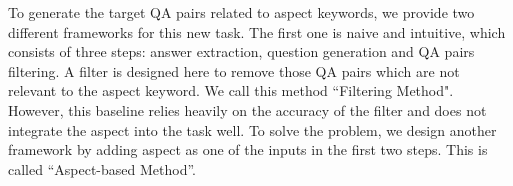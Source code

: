 


To generate the target QA pairs related to aspect keywords,
we provide two different frameworks for this new task.
The first one is naive and intuitive, which consists of three steps: answer extraction, question generation and QA pairs filtering. 
A filter is designed here to remove those QA pairs which are not relevant to the aspect keyword.
We call this method ``Filtering Method".
However, this baseline relies heavily on the accuracy of the filter and does not integrate the aspect into the task well. 
To solve the problem, we design another framework by adding aspect as one of the inputs in the first two steps. 
This is called ``Aspect-based Method''. 

